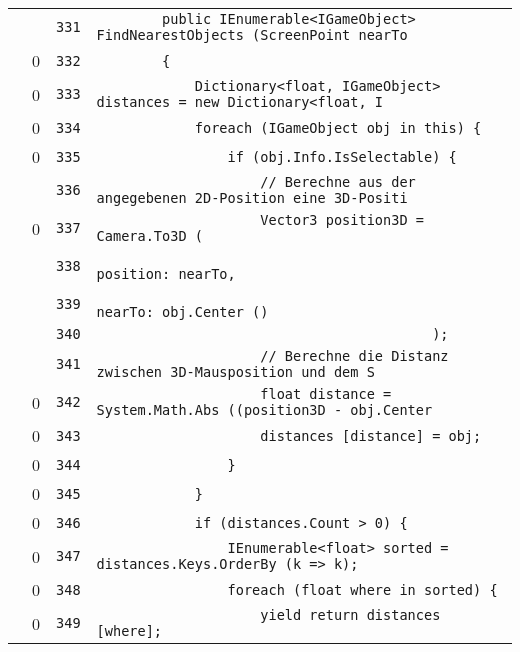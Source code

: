 \documentclass[a4paper,10pt]{article}
\begin{document}
\begin{longtable}[l]{lrrl}
\cellcolor{gray} &  & \verb~331~ & \verb~        public IEnumerable<IGameObject> FindNearestObjects (ScreenPoint nearTo~\\
\cellcolor{red} & 0 & \verb~332~ & \verb~        {~\\
\cellcolor{red} & 0 & \verb~333~ & \verb~            Dictionary<float, IGameObject> distances = new Dictionary<float, I~\\
\cellcolor{red} & 0 & \verb~334~ & \verb~            foreach (IGameObject obj in this) {~\\
\cellcolor{red} & 0 & \verb~335~ & \verb~                if (obj.Info.IsSelectable) {~\\
\cellcolor{gray} &  & \verb~336~ & \verb~                    // Berechne aus der angegebenen 2D-Position eine 3D-Positi~\\
\cellcolor{red} & 0 & \verb~337~ & \verb~                    Vector3 position3D = Camera.To3D (~\\
\cellcolor{gray} &  & \verb~338~ & \verb~                                             position: nearTo,~\\
\cellcolor{gray} &  & \verb~339~ & \verb~                                             nearTo: obj.Center ()~\\
\cellcolor{gray} &  & \verb~340~ & \verb~                                         );~\\
\cellcolor{gray} &  & \verb~341~ & \verb~                    // Berechne die Distanz zwischen 3D-Mausposition und dem S~\\
\cellcolor{red} & 0 & \verb~342~ & \verb~                    float distance = System.Math.Abs ((position3D - obj.Center~\\
\cellcolor{red} & 0 & \verb~343~ & \verb~                    distances [distance] = obj;~\\
\cellcolor{red} & 0 & \verb~344~ & \verb~                }~\\
\cellcolor{red} & 0 & \verb~345~ & \verb~            }~\\
\cellcolor{red} & 0 & \verb~346~ & \verb~            if (distances.Count > 0) {~\\
\cellcolor{red} & 0 & \verb~347~ & \verb~                IEnumerable<float> sorted = distances.Keys.OrderBy (k => k);~\\
\cellcolor{red} & 0 & \verb~348~ & \verb~                foreach (float where in sorted) {~\\
\cellcolor{red} & 0 & \verb~349~ & \verb~                    yield return distances [where];~\\

\end{longtable}
\end{document}
